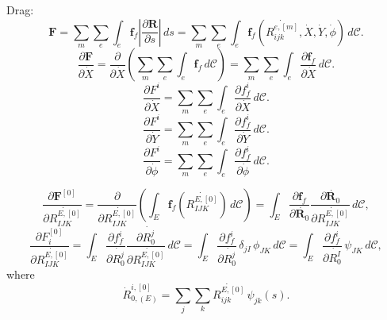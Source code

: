 \documentclass[a4paper,12pt]{article}
\begin{document}
Drag:
\begin{equation}
	\label{eqn:133}
\bm{F}= \sum_m \sum_e \int_e \bm{f}_f \left|\frac{\partial\textbf{R}}{\partial s}\right|\,ds=\sum_m \sum_e \int_e \bm{f}_f(\dot{R_{ijk}^{e,[m]}},\dot{X},\dot{Y},\dot{\phi})\,d\mathcal{C}.
\end{equation}
\begin{equation}
	\label{eqn:134}
	\frac{\partial \bm{F}}{\partial \dot{X}}= \frac{\partial}{\partial \dot{X}}\left(\sum_m \sum_e \int_e \bm{f}_f\,d\mathcal{C}\right)=\sum_m \sum_e \int_e \frac{\partial \bm{f}_f}{\partial \dot{X}}\,d\mathcal{C}.
\end{equation}
\begin{equation}
	\label{eqn:135}
	\frac{\partial F^i}{\partial \dot{X}}=\sum_m \sum_e \int_e \frac{\partial f_{f}^i}{\partial \dot{X}}\,d\mathcal{C}.
\end{equation}
\begin{equation}
	\label{eqn:136}
	\frac{\partial F^i}{\partial \dot{Y}}=\sum_m \sum_e \int_e \frac{\partial f_{f}^i}{\partial \dot{Y}}\,d\mathcal{C}.
\end{equation}
\begin{equation}
	\label{eqn:137}
	\frac{\partial F^i}{\partial \dot{\phi}}=\sum_m \sum_e \int_e \frac{\partial f_{f}^i}{\partial \dot{\phi}}\,d\mathcal{C}.
\end{equation}

\begin{equation}
	\label{eqn:153}
	\frac{\partial \bm{F}^{[0]}}{\partial \dot{R_{IJK}^{E,[0]}}}=\frac{\partial}{\partial \dot{R_{IJK}^{E,[0]}}}\left(\int_E \bm{f}_f(\dot{R_{IJK}^{E,[0]}})\,d\mathcal{C}\right)=\int_E\frac{\partial \bm{f}_f}{\partial \dot{\bm{R}_0}} \frac{\partial \dot{\bm{R}_0}}{\partial \dot{R_{IJK}^{E,[0]}}}\,d\mathcal{C},
\end{equation}
\begin{equation}
	\label{eqn:154}
	\frac{\partial F_i^{[0]}}{\partial \dot{R_{IJK}^{E,[0]}}}=\int_E\frac{\partial f_{f}^i}{\partial \dot{R_0^j}} \frac{\partial \dot{R^j_0}}{\partial \dot{R_{IJK}^{E,[0]}}}\,d\mathcal{C}=\int_E\frac{\partial f_{f}^i}{\partial \dot{R_0^j}}\, \delta_{jI}\,\phi_{JK}\,d\mathcal{C}=\int_E\frac{\partial f_{f}^i}{\partial \dot{R_0^I}}\,\psi_{JK}\,d\mathcal{C},
\end{equation}
where 
\begin{equation}
	\label{eqn:155}
	\dot{R}^{i,[0]}_{0,(E)}=\sum_j\sum_k \dot{R_{ijk}^{E,[0]}}\,\psi_{jk}(s).
\end{equation}
\end{document}
